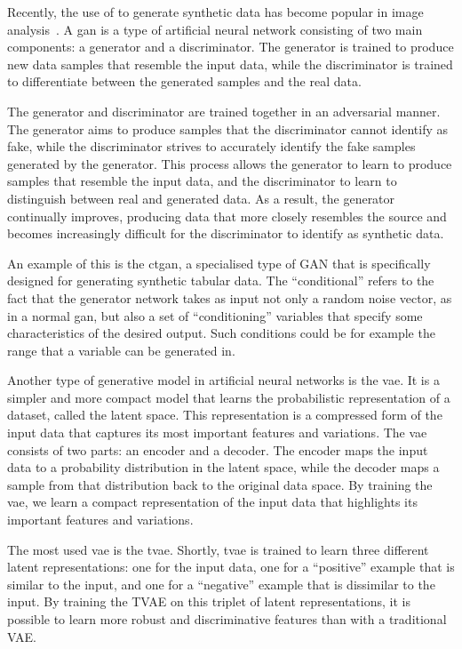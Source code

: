 \documentclass[12pt, a4paper]{article}
\begin{document}
Recently, the use of  to generate synthetic data has become popular in image
analysis~\cite{pavan_kumar_generative_2021}. A \acrshort{gan} is a type of artificial neural network consisting of two
main components: a generator and a discriminator. The generator is trained to produce new data samples that resemble
the input data, while the discriminator is trained to differentiate between the generated samples and the real
data.~\cite{pavan_kumar_generative_2021}

The generator and discriminator are trained together in an adversarial manner. The generator aims to produce samples
that the discriminator cannot identify as fake, while the discriminator strives to accurately identify the fake samples
generated by the generator. This process allows the generator to learn to produce samples that resemble the input data,
and the discriminator to learn to distinguish between real and generated data. As a result, the generator continually
improves, producing data that more closely resembles the source and becomes increasingly difficult for the
discriminator to identify as synthetic data.~\cite{pavan_kumar_generative_2021}

An example of this is the \acrfull{ctgan}, a specialised type of GAN that is specifically designed for generating
synthetic tabular data. The ``conditional'' refers to the fact that the generator network takes as input not only a
random noise vector, as in a normal \acrshort{gan}, but also a set of ``conditioning'' variables that specify some
characteristics of the desired output. Such conditions could be for example the range that a variable can be generated
in.~\cite{xu_modeling_2019}

Another type of generative model in artificial neural networks is the \acrfull{vae}. It is a simpler and more compact
model that learns the probabilistic representation of a dataset, called the latent space. This representation is a
compressed form of the input data that captures its most important features and variations. The \acrshort{vae} consists
of two parts: an encoder and a decoder. The encoder maps the input data to a probability distribution in the latent
space, while the decoder maps a sample from that distribution back to the original data space. By training the
\acrshort{vae}, we learn a compact representation of the input data that highlights its important features and
variations.~\cite{kingma_auto-encoding_2013}

The most used \acrshort{vae} is the \acrfull{tvae}. Shortly, \acrshort{tvae} is trained to learn three different latent
representations: one for the input data, one for a ``positive'' example that is similar to the input, and one for a
``negative'' example that is dissimilar to the input. By training the TVAE on this triplet of latent representations,
it is possible to learn more robust and discriminative features than with a traditional VAE.~\cite{ishfaq_tvae_2018}
\end{document}
